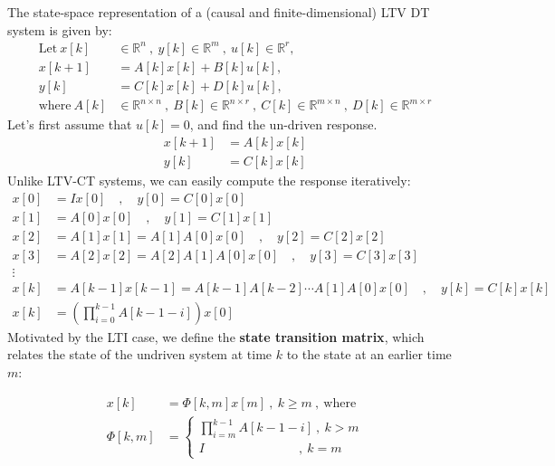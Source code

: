 \documentclass[twoside]{article}
\begin{document}
The state-space representation of a (causal and finite-dimensional) LTV DT system is given by:
%
\begin{align*}
  \mathrm{Let} \ x[k] &\in \mathbb{R}^n \ , \ y[k] \in \mathbb{R}^m \ ,\  u[k] \in
  \mathbb{R}^r , \\
  x[k+1] &= A[k] x[k] + B[k] u[k] , \\
  y[k] &= C[k] x[k] + D[k] u[k] , \\
  \mathrm{where} \ A[k] &\in \mathbb{R}^{n \times n} \ , \ 
    B[k] \in \mathbb{R}^{n \times r} \ ,\  C[k] \in \mathbb{R}^{m \times n} \ , \ D[k] \in \mathbb{R}^{m \times r}
\end{align*}
%
Let's first assume that $u[k] = 0$, and find the un-driven response.
%
\begin{align*}
  x[k+1] &= A[k] x[k] \\ y[k] &= C[k] x[k]
\end{align*}
%
Unlike LTV-CT systems, we can easily compute the response iteratively:
%
\begin{align*}
   x[0] &= I x[0] \quad , \quad y[0] = C[0] x[0]
   \\
  x[1] &= A[0] x[0] \quad , \quad y[1] = C[1] x[1]
  \\
  x[2] &= A[1] x[1] = A[1] A[0] x[0] \quad , \quad y[2] = C[2] x[2]
  \\
  x[3] &= A[2] x[2] = A[2] A[1] A[0] x[0] \quad , \quad y[3] = C[3] x[3]
  \\
  \vdots
  \\
  x[k] &= A[k-1] x[k-1] = A[k-1] A[k-2] \cdots A[1] A[0] x[0]  \quad , \quad y[k] = C[k] x[k]
  \\
  x[k] &= \left( \prod_{i=0}^{k-1} A[k-1-i] \right) x[0]
\end{align*}
%
Motivated by the LTI case, we define the \textbf{state transition matrix}, which relates the state of the undriven system at time $k$ to the state at an earlier time $m$:
%
\begin{mdframed}[backgroundcolor=black!5, linecolor=black!20]
\begin{align*}
  x[k] &= \Phi[k,m] x[m] \ , \  k \geq m \ , \  \mathrm{where}
  \\
  \Phi[k,m] &= \left\lbrace \begin{array}{l} \prod_{i=m}^{k-1} A[k-1-i] \ , \ k > m 
  \\ I \quad \quad \quad \quad  \quad \quad  \quad \ \ , \ k = m 
  \end{array} \right.
\end{align*}
\end{mdframed}
\end{document}
